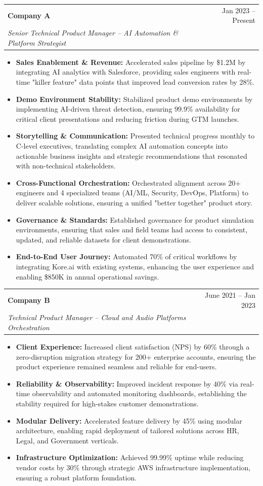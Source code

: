 \documentclass[letterpaper,10pt]{article}
\makeatletter
\newcommand{\resumeItem}[1]{
  \item\small{
    {#1 \vspace{-2pt}}
  }
}
\newcommand{\resumeSubheading}[4]{
  \vspace{-2pt}\item
    \begin{tabular*}{0.97\textwidth}[t]{l@{\extracolsep{\fill}}r}
      \textbf{#1} & #2 \\
      \textit{\small#3} & \textit{\small #4} \\
    \end{tabular*}\vspace{-7pt}
}
\newcommand{\resumeItemListStart}{\begin{itemize}}
\newcommand{\resumeItemListEnd}{\end{itemize}\vspace{-5pt}}
\makeatother
\begin{document}
    \resumeSubheading
      {Company A}{Jan 2023 -- Present}
      {Senior Technical Product Manager -- AI Automation \& Platform Strategist}{}
      \resumeItemListStart
        \resumeItem{\textbf{Sales Enablement \& Revenue:} Accelerated sales pipeline by \$1.2M by integrating AI analytics with Salesforce, providing sales engineers with real-time "killer feature" data points that improved lead conversion rates by 28\%.}
        \resumeItem{\textbf{Demo Environment Stability:} Stabilized product demo environments by implementing AI-driven threat detection, ensuring 99.9\% availability for critical client presentations and reducing friction during GTM launches.}
        \resumeItem{\textbf{Storytelling \& Communication:} Presented technical progress monthly to C-level executives, translating complex AI automation concepts into actionable business insights and strategic recommendations that resonated with non-technical stakeholders.}
        \resumeItem{\textbf{Cross-Functional Orchestration:} Orchestrated alignment across 20+ engineers and 4 specialized teams (AI/ML, Security, DevOps, Platform) to deliver scalable solutions, ensuring a unified "better together" product story.}
        \resumeItem{\textbf{Governance \& Standards:} Established governance for product simulation environments, ensuring that sales and field teams had access to consistent, updated, and reliable datasets for client demonstrations.}
        \resumeItem{\textbf{End-to-End User Journey:} Automated 70\% of critical workflows by integrating Kore.ai with existing systems, enhancing the user experience and enabling \$850K in annual operational savings.}
      \resumeItemListEnd

    \resumeSubheading
      {Company B}{June 2021 -- Jan 2023}
      {Technical Product Manager -- Cloud and Audio Platforms Orchestration}{}
      \resumeItemListStart
        \resumeItem{\textbf{Client Experience:} Increased client satisfaction (NPS) by 60\% through a zero-disruption migration strategy for 200+ enterprise accounts, ensuring the product experience remained seamless and reliable for end-users.}
        \resumeItem{\textbf{Reliability \& Observability:} Improved incident response by 40\% via real-time observability and automated monitoring dashboards, establishing the stability required for high-stakes customer demonstrations.}
        \resumeItem{\textbf{Modular Delivery:} Accelerated feature delivery by 45\% using modular architecture, enabling rapid deployment of tailored solutions across HR, Legal, and Government verticals.}
        \resumeItem{\textbf{Infrastructure Optimization:} Achieved 99.99\% uptime while reducing vendor costs by 30\% through strategic AWS infrastructure implementation, ensuring a robust platform foundation.}
      \resumeItemListEnd
\end{document}

